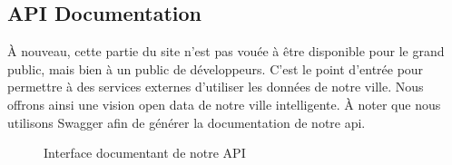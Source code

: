 \subsection{API Documentation}
À nouveau, cette partie du site n’est pas vouée à être disponible pour le grand public, mais bien à un public de développeurs. C’est le point d’entrée pour permettre à des services externes d’utiliser les données de notre ville. Nous offrons ainsi une vision open data de notre ville intelligente. À noter que nous utilisons Swagger afin de générer la documentation de notre api.
\begin{figure}[H]
    \begin{center}
        \caption{Interface documentant de notre API}
    \end{center}
\end{figure}